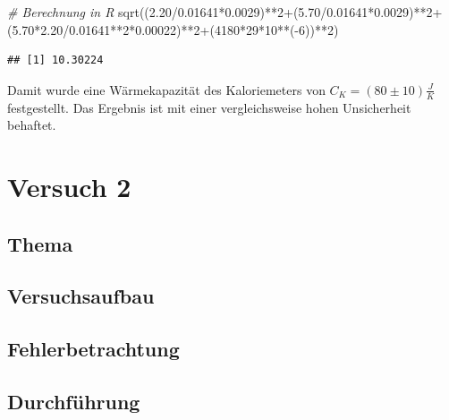 \documentclass[class=article, crop=false]{standalone}
\newenvironment{Shaded}{\begin{snugshade}}{\end{snugshade}}
\newcommand{\CommentTok}[1]{\textcolor[rgb]{0.56,0.35,0.01}{\textit{#1}}}
\newcommand{\DecValTok}[1]{\textcolor[rgb]{0.00,0.00,0.81}{#1}}
\newcommand{\FloatTok}[1]{\textcolor[rgb]{0.00,0.00,0.81}{#1}}
\newcommand{\FunctionTok}[1]{\textcolor[rgb]{0.00,0.00,0.00}{#1}}
\newcommand{\NormalTok}[1]{#1}
\newcommand{\SpecialCharTok}[1]{\textcolor[rgb]{0.00,0.00,0.00}{#1}}
\begin{document}
\begin{Shaded}
\begin{Highlighting}[]
\CommentTok{\# Berechnung in R}
\FunctionTok{sqrt}\NormalTok{((}\FloatTok{2.20}\SpecialCharTok{/}\FloatTok{0.01641}\SpecialCharTok{*}\FloatTok{0.0029}\NormalTok{)}\SpecialCharTok{**}\DecValTok{2}\SpecialCharTok{+}\NormalTok{(}\FloatTok{5.70}\SpecialCharTok{/}\FloatTok{0.01641}\SpecialCharTok{*}\FloatTok{0.0029}\NormalTok{)}\SpecialCharTok{**}\DecValTok{2}\SpecialCharTok{+}
\NormalTok{       (}\FloatTok{5.70}\SpecialCharTok{*}\FloatTok{2.20}\SpecialCharTok{/}\FloatTok{0.01641}\SpecialCharTok{**}\DecValTok{2}\SpecialCharTok{*}\FloatTok{0.00022}\NormalTok{)}\SpecialCharTok{**}\DecValTok{2}\SpecialCharTok{+}\NormalTok{(}\DecValTok{4180}\SpecialCharTok{*}\DecValTok{29}\SpecialCharTok{*}\DecValTok{10}\SpecialCharTok{**}\NormalTok{(}\SpecialCharTok{{-}}\DecValTok{6}\NormalTok{))}\SpecialCharTok{**}\DecValTok{2}\NormalTok{)}
\end{Highlighting}
\end{Shaded}

\begin{verbatim}
## [1] 10.30224
\end{verbatim}

Damit wurde eine Wärmekapazität des Kaloriemeters von
\(C_K=(80 \pm 10)\frac{J}{K}\) festgestellt. Das Ergebnis ist mit einer
vergleichsweise hohen Unsicherheit behaftet.

\hypertarget{versuch-2}{%
\section{Versuch 2}\label{versuch-2}}

\hypertarget{thema-1}{%
\subsection{Thema}\label{thema-1}}

\hypertarget{versuchsaufbau}{%
\subsection{Versuchsaufbau}\label{versuchsaufbau}}

\hypertarget{fehlerbetrachtung-1}{%
\subsection{Fehlerbetrachtung}\label{fehlerbetrachtung-1}}

\hypertarget{durchfuxfchrung}{%
\subsection{Durchführung}\label{durchfuxfchrung}}
\end{document}

